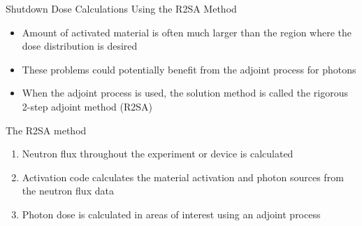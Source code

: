 \documentclass{beamer}
\begin{document}
\begin{frame}{Shutdown Dose Calculations Using the R2SA Method}
  
  \begin{itemize}
    \item Amount of activated material is often much larger than the region 
      where the dose distribution is desired 
      \medskip
    \item These problems could potentially benefit from the adjoint process
      for photons
      \medskip
    \item When the adjoint process is used, the solution method is called the
      rigorous 2-step adjoint method (R2SA)
  \end{itemize}

  \medskip
  \medskip

  \begin{beamerboxesrounded}[upper=boxheadcolor,lower=boxbodycolor,shadow=true]{The R2SA method}
    \begin{enumerate}
      \item Neutron flux throughout the experiment or device is calculated
        \smallskip
      \item Activation code calculates the material activation and photon
        sources from the neutron flux data
        \smallskip
      \item Photon dose is calculated in areas of interest using an adjoint
        process 
    \end{enumerate}
  \end{beamerboxesrounded}

\end{frame}
\end{document}

